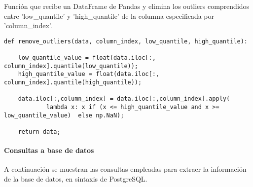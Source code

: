 \documentclass{report}
\begin{document}
Función que recibe un DataFrame de Pandas y elimina los outliers comprendidos entre 'low\_quantile' y 'high\_quantile' de la columna especificada por 'column\_index'.

\begin{verbatim}
def remove_outliers(data, column_index, low_quantile, high_quantile):
    
    low_quantile_value = float(data.iloc[:, column_index].quantile(low_quantile));
    high_quantile_value = float(data.iloc[:, column_index].quantile(high_quantile));

    data.iloc[:,column_index] = data.iloc[:,column_index].apply(
            lambda x: x if (x <= high_quantile_value and x >= low_quantile_value)  else np.NaN);
    
    return data;
\end{verbatim}
\newpage
\paragraph{Consultas a base de datos}

A continuación se muestran las consultas empleadas para extraer la información de la base de datos, en sintaxis de PostgreSQL.
\end{document}
